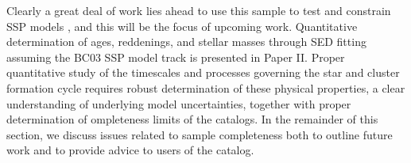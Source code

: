 \documentclass[linenumbers]{aastex63}
\begin{document}
{Clearly a great deal of work lies ahead to use this sample to test and constrain SSP models \citep[e.g.,][and references therein]{wofford_comprehensive_2016}, and this will be the focus of upcoming work.  Quantitative determination of ages, reddenings, and stellar masses through SED fitting assuming the BC03 SSP model track is presented in Paper II. Proper quantitative study of the timescales and processes governing the star and cluster formation cycle requires robust determination of these physical properties, a clear understanding of underlying model uncertainties, together with proper determination of  ompleteness limits of the catalogs.  In the remainder of this section, we  discuss issues related to sample completeness both to outline future work and to provide advice to users of the catalog.}
\end{document}
